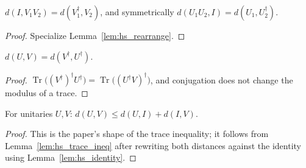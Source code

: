 \begin{lemma}
  \label{lem:hs_identity}
  \leanok
  $d(I, V_1 V_2) = d(V_1^\dagger, V_2)$, and symmetrically
  $d(U_1 U_2, I) = d(U_1, U_2^\dagger)$.
\end{lemma}

\begin{proof}
  \leanok
  Specialize Lemma~\ref{lem:hs_rearrange}.
\end{proof}

\begin{lemma}
  \label{lem:hs_dagger}
  \leanok
  $d(U,V) = d(V^\dagger, U^\dagger)$.
\end{lemma}

\begin{proof}
  \leanok
  $\operatorname{Tr}\!\big((V^\dagger)^\dagger U^\dagger\big)
    = \operatorname{Tr}\!\big((U^\dagger V)^\dagger\big)$, and conjugation does
  not change the modulus of a trace.
\end{proof}

\begin{lemma}
  \label{lem:hs_triangle_one}
  \leanok
  For unitaries $U, V$: $d(U,V) \le d(U,I) + d(I,V)$.
\end{lemma}

\begin{proof}
  \leanok
  This is the paper's shape of the trace inequality; it follows from
  Lemma~\ref{lem:hs_trace_ineq} after rewriting both distances against the
  identity using Lemma~\ref{lem:hs_identity}.
\end{proof}
